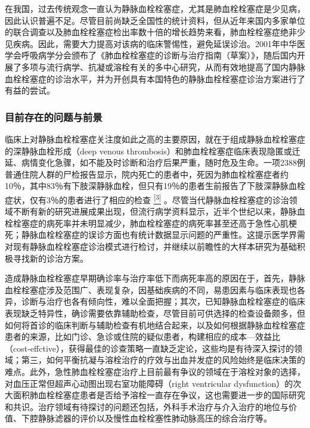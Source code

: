 在我国，过去传统观念一直认为静脉血栓栓塞症，尤其是肺血栓栓塞症是少见病，因此认识普遍不足。尽管目前尚缺乏全国性的统计资料，但从近年来国内多家单位的联合调查以及肺血栓栓塞症检出率数十倍的增长趋势来看，肺血栓栓塞症绝非少见疾病。因此，需要大力提高对该病的临床警惕性，避免延误诊治。2001年中华医学会呼吸病学分会颁布了《肺血栓栓塞症的诊断与治疗指南（草案）》，随后国内开展了多项与流行病学、抗凝或溶栓有关的多中心研究，从而有效地提高了国内静脉血栓栓塞症的诊治水平，并为开创具有本国特色的静脉血栓栓塞症诊治方案进行了有益的尝试。

\subsubsection{目前存在的问题与前景}

临床上对静脉血栓栓塞症关注度如此之高的主要原因，就在于组成静脉血栓栓塞症的深静脉血栓形成（deep
venous
thrombosis）和肺血栓栓塞症临床表现隐匿或迁延、病情变化急骤，如不能及时诊断和治疗后果严重，随时危及生命。一项2388例普通住院人群的尸检报告显示，院内死亡的患者中，死因为肺血栓栓塞症者约10％，其中83％有下肢深静脉血栓，但只有19％的患者生前报告了下肢深静脉血栓症状，仅有3％的患者进行了相应的检查
\protect\hyperlink{text00022.htmlux5cux23ch3-21}{\textsuperscript{{[}3{]}}}
。尽管当代静脉血栓栓塞症的诊治领域不断有新的研究进展成果出现，但流行病学资料显示，近半个世纪以来，静脉血栓栓塞症的病死率并未明显减少，肺血栓栓塞症的病死率甚至还高于急性心肌梗死；静脉血栓栓塞症的误诊方面也有统计数据显示问题的严重性。这提示医学界需对现有静脉血栓栓塞症诊治模式进行检讨，并继续以前瞻性的大样本研究为基础积极寻找新的诊治方案。

造成静脉血栓栓塞症早期确诊率与治疗率低下而病死率高的原因在于，首先，静脉血栓栓塞症涉及范围广、表现复杂，因基础疾病的不同，易患因素与临床表现也各异，诊断与治疗也各有倾向性，难以全面把握；其次，已知静脉血栓栓塞症的临床表现缺乏特异性，确诊需要依靠辅助检查，尽管目前可供选择的检查设备颇多，但如何将首诊的临床判断与辅助检查有机地结合起来，以及如何根据静脉血栓栓塞症患者的来源，比如门诊、急诊或住院的疑似患者，构建相应的成本---效益比（cost-effctive），获得最佳的诊查策略一直缺乏定论，这些均是有待深入探讨的领域；第三，如何平衡抗凝与溶栓治疗的疗效与出血并发症的风险始终是临床决策的难点。此外，急性肺血栓栓塞症治疗上目前最有争议的领域在于溶栓对象的选择，对血压正常但超声心动图出现右室功能障碍（right
ventricular
dysfunction）的次大面积肺血栓栓塞症患者是否给予溶栓一直存在争议，这也需要进一步的国际研究和共识。治疗领域有待探讨的问题还包括，外科手术治疗与介入治疗的地位与价值、下腔静脉滤器的评价以及慢性血栓栓塞性肺动脉高压的综合治疗等。

